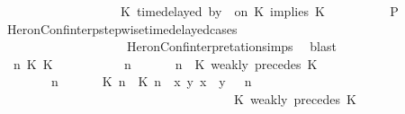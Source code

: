 \begin{isabellebody}
\ \ \ \ \ \ \ \ \ \ \ \ \ \ \ \ {\isasymturnstile}\ {\isasymPsi}\ {\isasymtriangleright}\ {\isacharparenleft}{\isacharparenleft}K\ time{\isacharminus}delayed\ by\ {\isasymdelta}{\isasymtau}\ on\ K\ implies\ K\ {\isacharhash}\ {\isasymPhi}{\isacharparenright}{\isacharparenright}{\isacartoucheclose}\isanewline
\ \ \ \ \ \ \isamarkupfalse%
\ {\isacharquery}P\ \isamarkupfalse%
\ HeronConf{\isacharunderscore}interp{\isacharunderscore}stepwise{\isacharunderscore}timedelayed{\isacharunderscore}cases\isanewline
\ \ \ \ \ \ \ \ \ \ \ \ \ \ \ \ \ \ \ \ HeronConf{\isacharunderscore}interpretation{\isachardot}simps\ \isamarkupfalse%
\ blast\isanewline
\ \ \ \ \isamarkupfalse%
\isanewline
\ \ \ \ \ \ \isamarkupfalse%
\ {\isasymGamma}\ n\ K\ K\ {\isasymPsi}\ {\isasymPhi}\isanewline
\ \ \ \ \ \ \isamarkupfalse%
\ {\isacartoucheopen}{\isacharparenleft}{\isasymGamma}\ n\ {\isasymturnstile}\ {\isasymPsi}\ {\isasymtriangleright}\ {\isasymPhi}\ {\isacharequal}\ {\isacharparenleft}{\isasymGamma}{\isacharcomma}\ n\ {\isasymturnstile}\ {\isacharparenleft}{\isacharparenleft}K\ weakly\ precedes\ K\ {\isacharhash}\ {\isasymPsi}{\isacharparenright}\ {\isasymtriangleright}\ {\isasymPhi}{\isacharparenright}{\isacartoucheclose}\isanewline
\ \ \ \ \ \ \ {\isacartoucheopen}{\isacharparenleft}{\isasymGamma}\ n\ {\isasymturnstile}\ {\isasymPsi}\ {\isasymtriangleright}\ {\isasymPhi}\ {\isacharequal}\ {\isacharparenleft}{\isacharparenleft}{\isacharparenleft}{\isasymlceil}{\isacharhash}\isactrlsup {\isasymle}\ K\ n{\isacharcomma}\ {\isacharhash}\isactrlsup {\isasymle}\ K\ n{\isasymrceil}\ {\isasymin}\ {\isacharparenleft}{\isasymlambda}{\isacharparenleft}x{\isacharcomma}\ y{\isacharparenright}{\isachardot}\ x\ {\isasymle}\ y{\isacharparenright}{\isacharparenright}\ {\isacharhash}\ {\isasymGamma}{\isacharparenright}{\isacharcomma}\ n\isanewline
\ \ \ \ \ \ \ \ \ \ \ \ \ \ \ \ \ \ \ \ \ \ \ \ \ \ \ \ \ \ \ \ \ \ {\isasymturnstile}\ {\isasymPsi}\ {\isasymtriangleright}\ {\isacharparenleft}{\isacharparenleft}K\ weakly\ precedes\ K\ {\isacharhash}\ {\isasymPhi}{\isacharparenright}{\isacharparenright}{\isacartoucheclose}\isanewline

\end{isabellebody}
